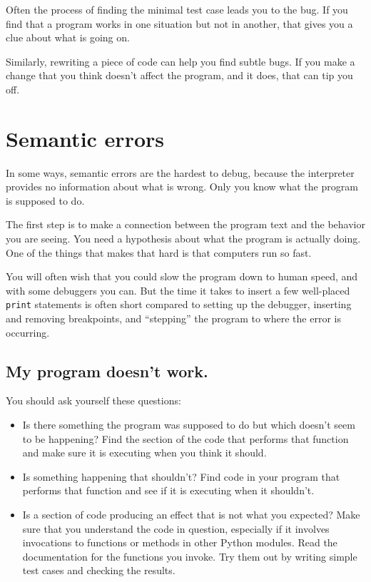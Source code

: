 \documentclass[10pt]{book}
\begin{document}

Often the process of finding the minimal test case leads you to the
bug.  If you find that a program works in one situation but not in
another, that gives you a clue about what is going on.

Similarly, rewriting a piece of code can help you find subtle
bugs.  If you make a change that you think doesn't affect the
program, and it does, that can tip you off.


\section{Semantic errors}

In some ways, semantic errors are the hardest to debug,
because the interpreter provides no information
about what is wrong.  Only you know what the program is supposed to
do.

The first step is to make a connection between the program
text and the behavior you are seeing.  You need a hypothesis
about what the program is actually doing.  One of the things
that makes that hard is that computers run so fast.

You will often wish that you could slow the program down to human
speed, and with some debuggers you can.  But the time it takes to
insert a few well-placed {\tt print} statements is often short compared to
setting up the debugger, inserting and removing breakpoints, and
``stepping'' the program to where the error is occurring.

\subsection{My program doesn't work.}

You should ask yourself these questions:

\begin{itemize}

\item Is there something the program was supposed to do but
which doesn't seem to be happening?  Find the section of the code
that performs that function and make sure it is executing when
you think it should.

\item Is something happening that shouldn't?  Find code in
your program that performs that function and see if it is
executing when it shouldn't.

\item Is a section of code producing an effect that is not
what you expected?  Make sure that you understand the code in
question, especially if it involves invocations to functions or methods in
other Python modules.  Read the documentation for the functions you invoke.
Try them out by writing simple test cases and checking the results.

\end{itemize}
\end{document}
